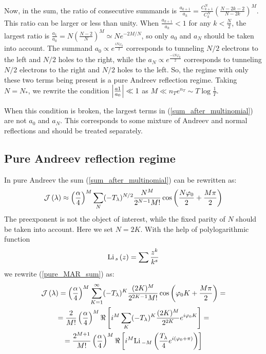 Now, in the sum, the ratio of consecutive summands is $ \frac{a_{k+1}}{a_{k}}=\frac{C_{k+1}^{N}}{C_{k}^{N}}\left(\frac{N-2k-2}{N-2k}\right)^{M} $. This ratio can be larger or less than unity.
When $ \frac{a_{k+1}}{a_{k}} <1 $ for any $ k<\frac{N}{2} $, the largest ratio is  $ \frac{a_{1}}{a_{0}}=N(\frac{N-2}{N})^{M}\simeq Ne^{-2M/N} $, so only $ a_0 $ and $ a_N $ should be taken into account. 
The summand $ a_0  \propto e^{\frac{iN\varphi_0}{2}}$ corresponds to tunneling $ N/2 $ electrons to the left and  $ N/2 $ holes to the right, while the $ a_N\propto e^{\frac{-iN\varphi_0}{2}} $ corresponds to tunneling $ N/2 $ electrons to the right and  $ N/2 $ holes to the left. So, the regime with only these two terms being present is a pure Andreev reflection regime. Taking $ N=N_* $, we rewrite the condition $ \left|\frac{a1}{a_0}\right|\ll 1 $ as $ M\ll n_T e^{n_T} \sim T \log\frac{1}{T} $. 

When this condition is broken, the largest terms in (\ref{sum_after_multinomial}) are not $ a_0 $ and $ a_N $. This corresponds to some mixture of Andreev and normal reflections and should be treated separately.


\subsection{Pure Andreev reflection regime}
\label{sect:pure_MAR}

In pure Andreev the sum (\ref{sum_after_multinomial}) can be rewritten as:
\begin{gather}
\label{pure_MAR_sum}
	\mathcal{J}\left(\lambda\right)
	\approx
	\left(\frac{\alpha}{4}\right)^{M}\sum_{N}(-T_{\lambda})^{N/2}\frac{N^{M}}{2^{N-1}M!}\cos\left(\frac{N\varphi_0}{2}+\frac{M\pi}{2}\right)
\end{gather}
The preexponent is not the object of interest, while the fixed parity of $ N $ should be taken into account. Here we set $ N=2K $. With the help of polylogarithmic function
\begin{gather}
	\mathrm{Li}\,_s\left(z\right)
	=
	\sum\frac{z^k}{k^s}
\end{gather}
we rewrite (\ref{pure_MAR_sum}) as:
\begin{multline}
\label{pure_MAR_to_polylog}
	\mathcal{J}\left(\lambda\right)=
	\left(\frac{\alpha}{4}\right)^{M}\sum_{K=1}^{\infty}(-T_{\lambda})^{K}\frac{(2K)^{M}}{2^{2K-1}M!}\cos\left(\varphi_{0}K+\frac{M\pi}{2}\right)=
	\\
	=\frac{2}{M!}\left(\frac{\alpha}{4}\right)^{M}\Re\left[i^{M}\sum_{K}(-T_{\lambda})^{K}\frac{(2K)^{M}}{2^{2K}}e^{i\varphi_{0}K}\right]=\\=\frac{2^{M+1}}{M!}\left(\frac{\alpha}{4}\right)^{M}\Re\left[i^{M}\mathrm{Li}\,_{-M}\left(\frac{T_{\lambda}}{4}e^{i(\varphi_{0}+\pi)}\right)\right]
\end{multline}


